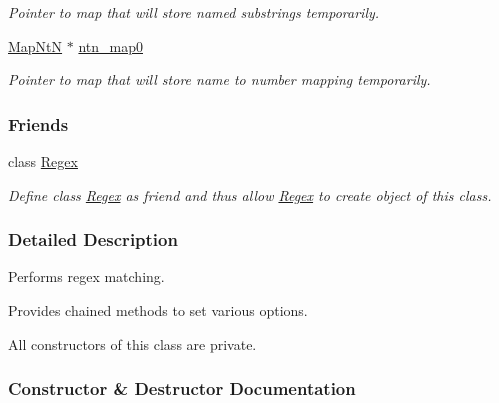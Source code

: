\begin{DoxyCompactItemize}
\begin{DoxyCompactList}\small\item\em Pointer to map that will store named substrings temporarily. \end{DoxyCompactList}\item 
\hyperlink{namespacejpcre2_a753ebedfb8caf4a16ffbf47d8d705656}{Map\+NtN} $\ast$ \hyperlink{classjpcre2_1_1RegexMatch_a1c790683d023313967ce80db6045419f}{ntn\+\_\+map0}\hypertarget{classjpcre2_1_1RegexMatch_a1c790683d023313967ce80db6045419f}{}\label{classjpcre2_1_1RegexMatch_a1c790683d023313967ce80db6045419f}

\begin{DoxyCompactList}\small\item\em Pointer to map that will store name to number mapping temporarily. \end{DoxyCompactList}\end{DoxyCompactItemize}
\subsubsection*{Friends}
\begin{DoxyCompactItemize}
\item 
class \hyperlink{classjpcre2_1_1RegexMatch_a1f6f7620b7d2218c6c2a6a47f432ea6a}{Regex}\hypertarget{classjpcre2_1_1RegexMatch_a1f6f7620b7d2218c6c2a6a47f432ea6a}{}\label{classjpcre2_1_1RegexMatch_a1f6f7620b7d2218c6c2a6a47f432ea6a}

\begin{DoxyCompactList}\small\item\em Define class \hyperlink{classjpcre2_1_1Regex}{Regex} as friend and thus allow \hyperlink{classjpcre2_1_1Regex}{Regex} to create object of this class. \end{DoxyCompactList}\end{DoxyCompactItemize}


\subsubsection{Detailed Description}
Performs regex matching. 

Provides chained methods to set various options.

All constructors of this class are private. 

\subsubsection{Constructor \& Destructor Documentation}
